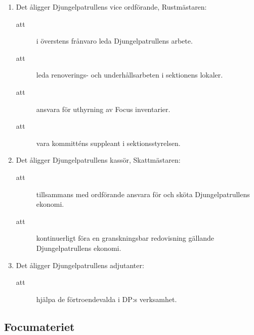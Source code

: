 \documentclass[11pt,a4paper]{article}
\begin{document}
\begin{enumerate}[\thesubsection .1]
  \item Det åligger Djungelpatrullens vice ordförande, Rustmästaren:
    \begin{description}
      \item[att] i överstens frånvaro leda Djungelpatrullens arbete.
      \item[att] leda renoverings- och underhållsarbeten i sektionens lokaler.
      \item[att] ansvara för uthyrning av Focus inventarier.
      \item[att] vara kommitténs suppleant i sektionsstyrelsen.
    \end{description}

  \item Det åligger Djungelpatrullens kassör, Skattmästaren:
    \begin{description}
      \item[att] tillsammans med ordförande ansvara för och sköta Djungelpatrullens ekonomi.
      \item[att] kontinuerligt föra en granskningsbar redovisning gällande Djungelpatrullens ekonomi.
    \end{description}

  \item Det åligger Djungelpatrullens adjutanter:
    \begin{description}
      \item[att] hjälpa de förtroendevalda i DP:s verksamhet.
 
    \end{description}

\end{enumerate}

\subsection{Focumateriet}
\end{document}
